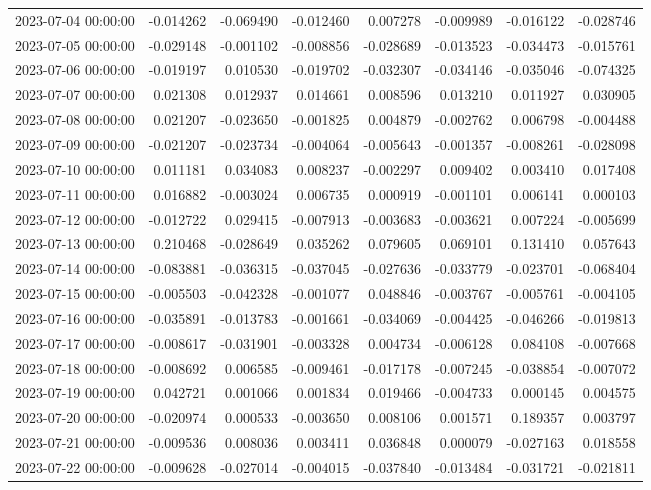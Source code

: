 \begin{tabular}{lrrrrrrr}
2023-07-04 00:00:00 & -0.014262 & -0.069490 & -0.012460 & 0.007278 & -0.009989 & -0.016122 & -0.028746 \\
2023-07-05 00:00:00 & -0.029148 & -0.001102 & -0.008856 & -0.028689 & -0.013523 & -0.034473 & -0.015761 \\
2023-07-06 00:00:00 & -0.019197 & 0.010530 & -0.019702 & -0.032307 & -0.034146 & -0.035046 & -0.074325 \\
2023-07-07 00:00:00 & 0.021308 & 0.012937 & 0.014661 & 0.008596 & 0.013210 & 0.011927 & 0.030905 \\
2023-07-08 00:00:00 & 0.021207 & -0.023650 & -0.001825 & 0.004879 & -0.002762 & 0.006798 & -0.004488 \\
2023-07-09 00:00:00 & -0.021207 & -0.023734 & -0.004064 & -0.005643 & -0.001357 & -0.008261 & -0.028098 \\
2023-07-10 00:00:00 & 0.011181 & 0.034083 & 0.008237 & -0.002297 & 0.009402 & 0.003410 & 0.017408 \\
2023-07-11 00:00:00 & 0.016882 & -0.003024 & 0.006735 & 0.000919 & -0.001101 & 0.006141 & 0.000103 \\
2023-07-12 00:00:00 & -0.012722 & 0.029415 & -0.007913 & -0.003683 & -0.003621 & 0.007224 & -0.005699 \\
2023-07-13 00:00:00 & 0.210468 & -0.028649 & 0.035262 & 0.079605 & 0.069101 & 0.131410 & 0.057643 \\
2023-07-14 00:00:00 & -0.083881 & -0.036315 & -0.037045 & -0.027636 & -0.033779 & -0.023701 & -0.068404 \\
2023-07-15 00:00:00 & -0.005503 & -0.042328 & -0.001077 & 0.048846 & -0.003767 & -0.005761 & -0.004105 \\
2023-07-16 00:00:00 & -0.035891 & -0.013783 & -0.001661 & -0.034069 & -0.004425 & -0.046266 & -0.019813 \\
2023-07-17 00:00:00 & -0.008617 & -0.031901 & -0.003328 & 0.004734 & -0.006128 & 0.084108 & -0.007668 \\
2023-07-18 00:00:00 & -0.008692 & 0.006585 & -0.009461 & -0.017178 & -0.007245 & -0.038854 & -0.007072 \\
2023-07-19 00:00:00 & 0.042721 & 0.001066 & 0.001834 & 0.019466 & -0.004733 & 0.000145 & 0.004575 \\
2023-07-20 00:00:00 & -0.020974 & 0.000533 & -0.003650 & 0.008106 & 0.001571 & 0.189357 & 0.003797 \\
2023-07-21 00:00:00 & -0.009536 & 0.008036 & 0.003411 & 0.036848 & 0.000079 & -0.027163 & 0.018558 \\
2023-07-22 00:00:00 & -0.009628 & -0.027014 & -0.004015 & -0.037840 & -0.013484 & -0.031721 & -0.021811 \\

\end{tabular}
